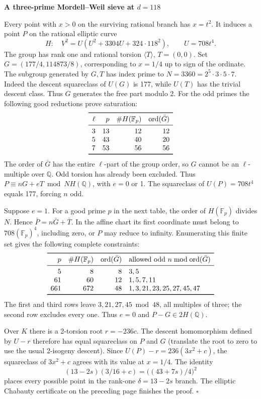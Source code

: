 \documentclass[12pt]{article}
\newcommand{\Q}{\mathbb Q}\newcommand{\Z}{\mathbb Z}
\newcommand{\heading}[1]{{\Large\bfseries\color{ink}#1}\par\vspace{3pt}}
\begin{document}
\newpage
\heading{A three-prime Mordell--Weil sieve at $d=118$}
Every point with $x>0$ on the surviving rational branch has $x=t^2$. It induces a point $P$ on the rational elliptic curve
\[
 H:\quad V^2=U(U^2+3304U+324\cdot118^2),\qquad U=708t^4.
\]
The group has rank one and rational torsion $\langle T\rangle$, $T=(0,0)$. Set $G=(177/4,114873/8)$, corresponding to $x=1/4$ up to sign of the ordinate. The subgroup generated by $G,T$ has index prime to $N=3360=2^5\cdot3\cdot5\cdot7$. Indeed the descent squareclass of $U(G)$ is 177, while $U(T)$ has the trivial descent class. Thus $G$ generates the free part modulo 2. For the odd primes the following good reductions prove saturation:
\[
\begin{array}{rrrr}
\toprule \ell&p&\#H(\mathbb F_p)&\operatorname{ord}(\bar G)\\\midrule
3&13&12&12\\5&43&40&20\\7&53&56&56\\\bottomrule
\end{array}
\]
The order of $\bar G$ has the entire $\ell$-part of the group order, so $G$ cannot be an $\ell$-multiple over $\Q$. Odd torsion has already been excluded. Thus $P\equiv nG+eT\bmod NH(\Q)$, with $e=0$ or 1. The squareclass of $U(P)=708t^4$ equals 177, forcing $n$ odd.

Suppose $e=1$. For a good prime $p$ in the next table, the order of $H(\mathbb F_p)$ divides $N$. Hence $\bar P=n\bar G+\bar T$. In the affine chart its first coordinate must belong to $708(\mathbb F_p)^4$, including zero, or $P$ may reduce to infinity. Enumerating this finite set gives the following complete constraints:
\[
\begin{array}{rrrl}
\toprule p&\#H(\mathbb F_p)&\operatorname{ord}(\bar G)&
 \text{allowed odd }n\bmod\operatorname{ord}(\bar G)\\\midrule
5&8&8&3,5\\
61&60&12&1,5,7,11\\
661&672&48&1,3,21,23,25,27,45,47\\\bottomrule
\end{array}
\]
The first and third rows leave $3,21,27,45\bmod48$, all multiples of three; the second row excludes every one. Thus $e=0$ and $P-G\in2H(\Q)$.

Over $K$ there is a 2-torsion root $r=-236c$. The descent homomorphism defined by $U-r$ therefore has equal squareclass on $P$ and $G$ (translate the root to zero to use the usual 2-isogeny descent). Since $U(P)-r=236(3x^2+c)$, the squareclass of $3x^2+c$ agrees with its value at $x=1/4$. The identity
\[
  (13-2s)(3/16+c)=\bigl((43+7s)/4\bigr)^2
\]
places every possible point in the rank-one $\delta=13-2s$ branch. The elliptic Chabauty certificate on the preceding page finishes the proof. \hfill$\square$
\end{document}
